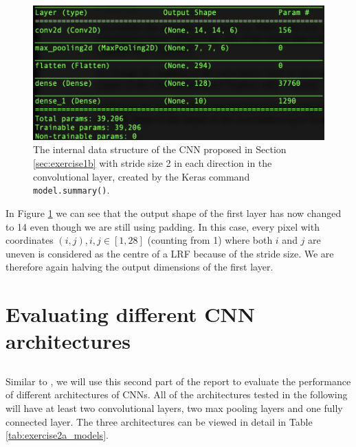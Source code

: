 \documentclass[12pt]{article}
\begin{document}
\begin{figure}[ht]
\centering
   \includegraphics[scale=0.7]{graphics/model1e.png}
    \caption{The internal data structure of the CNN proposed in Section \ref{sec:exercise1b} with stride size 2 in each direction in the convolutional layer, created by the Keras command \texttt{model.summary()}.}
    \label{fig:exercise1e}
\end{figure}

In Figure \ref{fig:exercise1e} we can see that the output shape of the first layer has now changed to 14 even though we are still using padding. In this case, every pixel with coordinates $(i,j), i, j \in [1,28]$ (counting from 1) where both $i$ and $j$ are uneven is considered as the centre of a LRF because of the stride size. We are therefore again halving the output dimensions of the first layer. 


\section{Evaluating different CNN architectures}
\subsection{}\label{sec:exercise2a}
Similar to \cite{JG}, we will use this second part of the report to evaluate the performance of different architectures of CNNs. All of the architectures tested in the following will have at least two convolutional layers, two max pooling layers and one fully connected layer. The three architectures can be viewed in detail in Table \ref{tab:exercise2a_models}.
\end{document}
